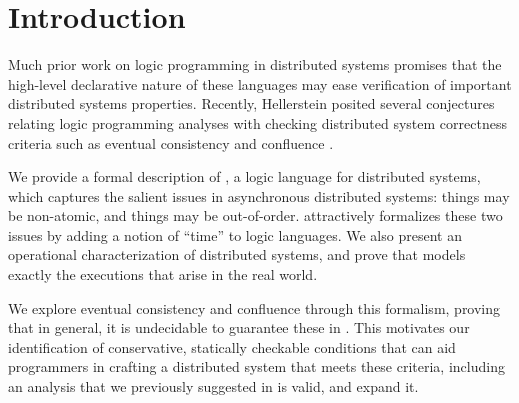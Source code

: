 \section{Introduction}

Much prior work on logic programming in distributed systems promises that the high-level declarative nature of these languages may ease verification of important distributed systems properties.  Recently, Hellerstein posited several conjectures relating logic programming analyses with checking distributed system correctness criteria such as eventual consistency and confluence .  

We provide a formal description of \lang, a logic language for distributed systems, which captures the salient issues in asynchronous distributed systems: things may be non-atomic, and things may be out-of-order.  \lang attractively formalizes these two issues by adding a notion of ``time'' to logic languages.
We also present an operational characterization of distributed systems, and prove that \lang models exactly the executions that arise in the real world.   

We explore eventual consistency and confluence through this formalism, proving that in general, it is undecidable to guarantee these in \lang.  This motivates our identification of conservative, statically checkable conditions that can aid programmers in crafting a distributed system that meets these criteria, including an analysis that we previously suggested in  is valid, and expand it.
